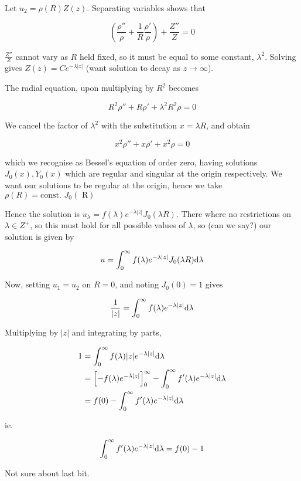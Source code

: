 \documentclass[a4paper]{article}
\begin{document}
Let $ u_{2} = \rho(R)Z(z) $.  Separating variables shows that

\[ \left(  \frac{\rho''}{\rho} + \frac{1}{R} \frac{\rho'}{\rho} \right) + \frac{Z''}{Z} = 0  \]

$ \frac{Z''}{Z} $ cannot vary as $ R $ held fixed, so it must be equal to some constant, $ \lambda^{2} $. Solving gives $ Z(z) = C e^{-\lambda| z |} $ (want solution to decay as $ z \to \infty $).

The radial equation, upon multiplying by $ R^{2} $ becomes

\[ R^{2} \rho'' + R \rho' + \lambda^{2} R^{2}  \rho = 0 \]

We cancel the factor of $ \lambda^{2} $ with the substitution $ x = \lambda R  $, and obtain 

\[ x^{2} \rho'' + x \rho' + x^{2} \rho = 0 \]

which we recognise as Bessel's equation of order zero, having solutions $ J_{0}(x), Y_{0}(x) $ which are regular and singular at the origin respectively. We want our solutions to be regular at the origin, hence we take $ \rho(R) = \text{const. }J_{0}(\text{ R}) $

Hence the solution is $ u_{\lambda} = f(\lambda) e^{-\lambda | z |} J_{0} (\lambda R) $. There where no restrictions on $ \lambda \in Z^{+} $, so this must hold for all possible values of $ \lambda $, so (can we say?) our solution is given by

\[ u = \int_{0}^{\infty} f(\lambda) e^{-\lambda | z |} J_{0} (\lambda R) \mathrm{d} \lambda  \]

Now, setting $ u_{1} = u_{2} $ on $ R = 0 $, and noting $ J_{0}(0) = 1 $ gives

\[ \frac{1}{| z |} = \int_{0}^{\infty} f(\lambda) e^{-\lambda | z |} \mathrm{d} \lambda \]

Multiplying by $ | z | $ and integrating by parts,

\begin{align*}
1 & = \int_{0}^{\infty} f(\lambda) | z |e^{-\lambda | z |} \mathrm{d} \lambda \\
& = \left[ - f(\lambda) e^{-\lambda | z |}  \right]_{0}^{\infty} - \int_{0}^{\infty} f'(\lambda) e^{-\lambda | z |} \mathrm{d} \lambda \\
& = f(0)  - \int_{0}^{\infty} f'(\lambda) e^{-\lambda | z |} \mathrm{d} \lambda
\end{align*}

ie.

\[  \int_{0}^{\infty} f'(\lambda) e^{-\lambda | z |} \mathrm{d} \lambda = f(0) - 1\]

Not sure about last bit.
\end{document}
